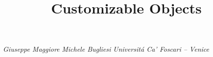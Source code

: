 \documentclass[a4paper]{article}
\begin{document}
\title{Customizable Objects}

\textit{Giuseppe Maggiore}
\textit{Michele Bugliesi}
\textit{Universitá Ca'  Foscari -- Venice}

 
 
 
\end{document}
